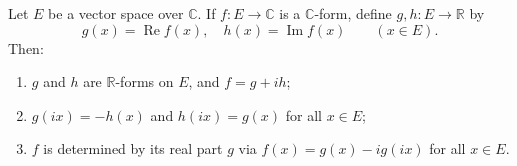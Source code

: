 Let $E$ be a vector space over $\mathbb{C}$. If $f: E \to \mathbb{C}$ is a $\mathbb{C}$-form, define $g, h: E \to \mathbb{R}$ by
$$g(x) = \operatorname{Re} f(x), \quad h(x) = \operatorname{Im} f(x) \qquad (x \in E).$$
Then:
\begin{enumerate}
\item[(i)] $g$ and $h$ are $\mathbb{R}$-forms on $E$, and $f = g + i h$;
\item[(ii)] $g(ix) = -h(x)$ and $h(ix) = g(x)$ for all $x \in E$;
\item[(iii)] $f$ is determined by its real part $g$ via $f(x) = g(x) - i g(ix)$ for all $x \in E$.
\end{enumerate}
